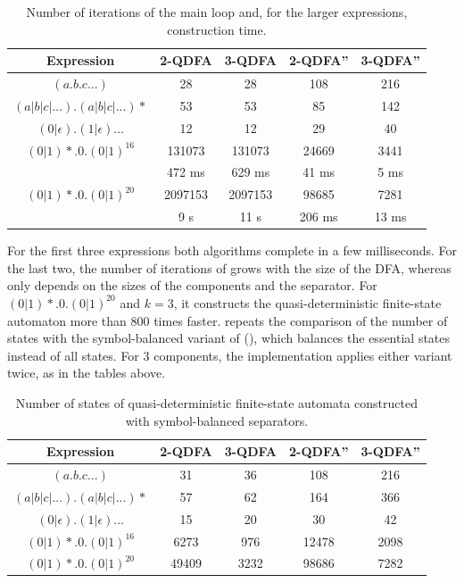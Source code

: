 \begin{table}[ht]
  \centering
  \begin{tabular}{||c c c c c||}
    \hline
    Expression & 2-QDFA & 3-QDFA & 2-QDFA'' & 3-QDFA'' \\ [0.5ex]
    \hline
    $(a.b.c...)$ & 28 & 28 & 108 & 216 \\
    \hline
    $(a|b|c|...).(a|b|c|...)*$ & 53 & 53 & 85 & 142 \\
    \hline
    $(0|\epsilon).(1|\epsilon)...$ & 12 & 12 & 29 & 40 \\
    \hline
    $(0|1)*.0.(0|1)^{16}$ & 131073 & 131073 & 24669 & 3441 \\
     & 472 ms & 629 ms & 41 ms & 5 ms \\
    \hline
    $(0|1)*.0.(0|1)^{20}$ & 2097153 & 2097153 & 98685 & 7281 \\
     & 9 s & 11 s & 206 ms & 13 ms \\
    \hline
  \end{tabular}
  \caption{Number of iterations of the main loop and, for the larger expressions,
    construction time.}
  \label{tbl:time_comparison}
\end{table}

For the first three expressions both algorithms complete in a few milliseconds. For
the last two, the number of iterations of  grows with the
size of the DFA, whereas  only depends on the
sizes of the components and the separator. For $(0|1)*.0.(0|1)^{20}$ and $k = 3$, it
constructs the quasi-deterministic finite-state automaton more than $800$ times faster.
\bigbreak
{} repeats the comparison of the number of states with the
symbol-balanced variant of 
(), which balances the essential states instead of
all states. For $3$ components, the implementation applies either variant twice, as in
the tables above.

\begin{table}[ht]
  \centering
  \small
  \setlength{\tabcolsep}{4pt}
  \begin{tabular}{||c c c c c||}
    \hline
    Expression & 2-QDFA & 3-QDFA & 2-QDFA'' & 3-QDFA'' \\ [0.5ex]
    \hline
    $(a.b.c...)$ & 31 & 36 & 108 & 216 \\
    \hline
    $(a|b|c|...).(a|b|c|...)*$ & 57 & 62 & 164 & 366 \\
    \hline
    $(0|\epsilon).(1|\epsilon)...$ & 15 & 20 & 30 & 42 \\
    \hline
    $(0|1)*.0.(0|1)^{16}$ & 6273 & 976 & 12478 & 2098 \\
    \hline
    $(0|1)*.0.(0|1)^{20}$ & 49409 & 3232 & 98686 & 7282 \\
    \hline
  \end{tabular}
  \caption{Number of states of quasi-deterministic finite-state automata constructed
    with symbol-balanced separators.}
  \label{tbl:symbol_comparison}
\end{table}

